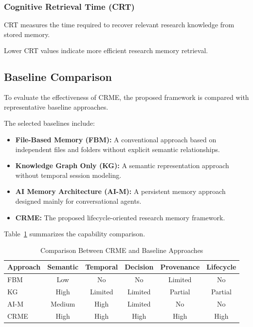\subsubsection{Cognitive Retrieval Time (CRT)}

CRT measures the time required to recover relevant research knowledge from stored memory.

Lower CRT values indicate more efficient research memory retrieval.



\subsection{Baseline Comparison}

To evaluate the effectiveness of CRME, the proposed framework is compared with representative baseline approaches.

The selected baselines include:

\begin{itemize}

\item \textbf{File-Based Memory (FBM):}
A conventional approach based on independent files and folders without explicit semantic relationships.

\item \textbf{Knowledge Graph Only (KG):}
A semantic representation approach without temporal session modeling.

\item \textbf{AI Memory Architecture (AI-M):}
A persistent memory approach designed mainly for conversational agents.

\item \textbf{CRME:}
The proposed lifecycle-oriented research memory framework.

\end{itemize}


Table~\ref{tab:baseline_comparison} summarizes the capability comparison.


\begin{table}[h]
\centering
\caption{Comparison Between CRME and Baseline Approaches}
\label{tab:baseline_comparison}

\begin{tabular}{lccccc}
\hline

Approach &
Semantic &
Temporal &
Decision &
Provenance &
Lifecycle\\

\hline

FBM & Low & No & No & Limited & No\\

KG & High & Limited & Limited & Partial & Partial\\

AI-M & Medium & High & Limited & No & No\\

CRME & High & High & High & High & High\\

\hline

\end{tabular}

\end{table}



